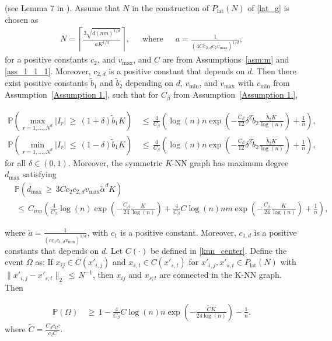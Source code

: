 \documentclass[twoside,11pt]{article}
\begin{document}
\begin{lemma}(see Lemma 7 in \cite{madrid2020adaptive}).
    \label{lemma_14}
Assume that $N$ in the construction
of $P_\text{lat}(N)$ of \eqref{lat_g} is chosen as 
\begin{align}
\label{eq:N_definition}
N = \left\lceil \frac{ 3\sqrt{d(nm)^{1/d}} }{aK^{1/d}}\right\rceil, \quad \,\,\,\text{where}\,\,\,\quad  a = \frac{1}{(4Cc_{2,d}c_2v_{\max})^{1/d}},
\end{align} 
for a positive constants \(c_2\), and \(v_{\max}\), and \(C\) are from Assumptions~\ref{asm:m} and \ref{ass_1_1_1}. 
Moreover, \(c_{2,d}\) is a positive constant that depends on \(d\). Then there exist positive constants \(\tilde b_1\) and \(\tilde b_2\) depending on \(d\), \(v_{\min}\), and \(v_{\max}\) with \(v_{\min}\) from Assumption~\ref{Assumption 1.}, such that for \(C_{\beta}\) from Assumption~\ref{Assumption 1.},

\begin{align}
\mathbb{P}\left( \max_{r=1,\ldots,N^d} |I_r| \,\geq\, (1 + \delta)\tilde b_1K \right) &\,\leq\, \frac{4}{C_{\beta}} \left(\log(n)n\exp\left( -\frac{C_{\beta}}{12}\delta^2 \tilde b_2\frac{\tilde b_2K}{\log(n)} \right) + \frac{1}{n} \right),
\label{eq:max_Ir_bound}
\end{align}
\begin{align}
\mathbb{P}\left( \min_{r=1,\ldots,N^d} |I_r| \,\leq\, (1 - \delta)\tilde b_1K \right) &\,\leq\, \frac{4}{C_{\beta}} \left(\log(n)n\exp\left( -\frac{C_{\beta}}{12}\delta^2 \tilde b_2\frac{\tilde b_2K}{\log(n)} \right) + \frac{1}{n} \right),
\label{eq:min_Ir_bound}
\end{align}
for all \(\delta \in (0, 1)\). Moreover, the symmetric \(K\)-NN graph has maximum degree \(d_{\max}\) satisfying
\begin{align}
&\mathbb{P}(d_{\max} \,\geq\, 3Cc_2c_{2,d}v_{\text{max}}{\tilde \alpha}^dK) \nonumber \\&\,\leq\, C_{nm} \left(\frac{4}{C_{\beta}} \log(n)\exp\left(-\frac{C_{\beta}}{24}\frac{K}{\log(n)}\right) + \frac{4}{C_{\beta}}C\log(n)nm\exp\left(-\frac{C_{\beta}}{24}\frac{K}{\log(n)}\right) + \frac{1}{n}\right),
\label{eq:d_max_bound}
\end{align}

where $\tilde a = \frac{1}{(cc_1c_{1,d}v_{\min})^{1/d}}$, with $c_1$ is a positive constant. 
Moreover, \( c_{1,d} \) is a positive constants that depends on \( d \). Let $C(\cdot)$ be defined in \eqref{knn_center}. 
Define the event $\Omega$ as: If \(x_{ij} \in C(x'_{i,j})\) and \(x_{s,t} \in C(x'_{s,t})\) for \(x'_{i,j}, x'_{s,t} \in P_{\text{lat}}(N)\) with \(\|x'_{i,j} - x'_{s,t}\|_2 \,\leq\, N^{-1}\), then \( x_{ij} \) and \( x_{s,t} \) are connected in the K-NN graph. Then

\begin{align}
\mathbb{P}(\Omega)
&\,\geq\, 1 - \frac{4}{C_{\beta}} C\log(n)n\exp\left(-\frac{\tilde C K}{24 \log(n)}\right) - \frac{1}{n}. \label{eq:291}
\end{align}
where $\tilde C = \frac{C_{\beta}c_1 c}{c_2 C}$.


\end{lemma}
\end{document}
